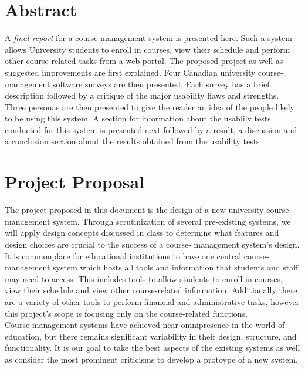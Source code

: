 \documentclass[10pt]{article}
\begin{document}
\begin{multicols}{2}

\section*{Abstract}
A \emph{final report} for a course-management system is presented 
here. Such a system allows University students to enroll in courses, view their 
schedule and perform other course-related tasks from a web portal. The proposed 
project as well as suggested improvements are first explained. Four Canadian 
university course-management software surveys are then presented. Each survey 
has a brief description followed by a critique of the major usability flaws and 
strengths. Three personas are then presented to give the reader an idea of the 
people likely to be using this system. A section for information about the usablily 
tests conducted for this system is presented next followed by a result, a discussion
and a conclusion section about the results obtained from the usability tests
\section*{Project Proposal}

The project proposed in this document is the design of a new 
university course-management system. Through scrutinization of several 
pre-existing systems, we will apply design concepts discussed in class to 
determine what features and design choices are crucial to the success of a course-
management system's design.\\

It is commonplace for educational institutions to have one central course-
management system which hosts all tools and information that students and staff 
may need to access. This includes tools to allow students to enroll in courses, 
view their schedule and view other course-related information. Additionally 
there are a variety of other tools to perform financial and administrative 
tasks, however this project's scope is focusing only on the course-related 
functions.\\

Course-management systems have achieved near omnipresence in 
the world of education, but there remains significant variability in their design, 
structure, and functionality. It is our goal to take the best aspects of the 
existing systems as well as consider the most prominent criticisms to develop a protoype of a new system.\\


\end{multicols}
\end{document}
